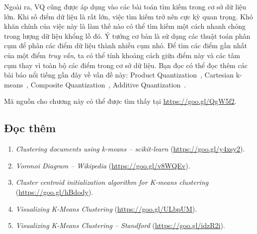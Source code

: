    Ngoài ra, VQ cũng được áp dụng vào các bài toán tìm kiếm trong cơ sở dữ liệu
    lớn. Khi số điểm dữ liệu là rất lớn, việc tìm kiếm trở nên cực kỳ quan
    trọng. Khó khăn chính của việc này là làm thế nào có thể tìm kiếm một cách
    nhanh chóng trong lượng dữ liệu khổng lồ đó. Ý tưởng cơ bản là sử dụng các
    thuật toán phân cụm để phân các điểm dữ liệu thành nhiều cụm nhỏ. Để tìm các
    điểm gần nhất của một điểm \textit{truy vấn}, ta có thể tính khoảng cách
    giữa điểm này và các tâm cụm thay vì toàn bộ các
    điểm trong cơ sở dữ liệu. Bạn đọc có thể đọc thêm các bài báo nổi tiếng gần
    đây về vấn đề này: Product Quantization~\cite{jegou2011product}, Cartesian
    k-means~\cite{norouzi2013cartesian,johnson2017billion}, Composite
    Quantization~\cite{zhang2014composite}, Additive
    Quantization~\cite{babenko2014additive}.


Mã nguồn cho chương này có thể được tìm thấy tại \url{https://goo.gl/QgW5f2}. 



\subsection{Đọc thêm}

\begin{enumerate}
	\item \textit{Clustering documents using k-means -- scikit-learn} (\url{https://goo.gl/y4xsy2}).

	\item \textit{Voronoi Diagram -- Wikipedia} (\url{https://goo.gl/v8WQEv}).

	\item \textit{Cluster centroid initialization algorithm for K-means clustering} (\url{https://goo.gl/hBdody}). 

	\item \textit{Visualizing K-Means Clustering} (\url{https://goo.gl/ULbpUM}). 

	\item \textit{Visualizing K-Means Clustering -- Standford} (\url{https://goo.gl/idzR2i}). 

\end{enumerate}


